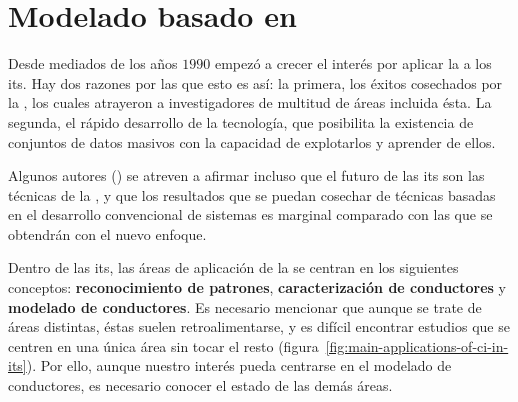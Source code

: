 \section{Modelado basado en }

Desde mediados de los años $1990$ empezó a crecer el interés por aplicar la  a los \gls{its}. Hay dos razones por las que esto es así: la primera, los éxitos cosechados por la , los cuales atrayeron a investigadores de multitud de áreas incluida ésta. La segunda, el rápido desarrollo de la tecnología, que posibilita la existencia de conjuntos de datos masivos con la capacidad de explotarlos y aprender de ellos.

Algunos autores (\cite{Zhang2011}) se atreven a afirmar incluso que el futuro de las \gls{its} son las técnicas de la , y que los resultados que se puedan cosechar de técnicas basadas en el desarrollo convencional de sistemas es marginal comparado con las que se obtendrán con el nuevo enfoque.

Dentro de las \gls{its}, las áreas de aplicación de la  se centran en los siguientes conceptos: \textbf{reconocimiento de patrones}, \textbf{caracterización de conductores} y \textbf{modelado de conductores}. Es necesario mencionar que aunque se trate de áreas distintas, éstas suelen retroalimentarse, y es difícil encontrar estudios que se centren en una única área sin tocar el resto (figura~\ref{fig:main-applications-of-ci-in-its}). Por ello, aunque nuestro interés pueda centrarse en el modelado de conductores, es necesario conocer el estado de las demás áreas.

